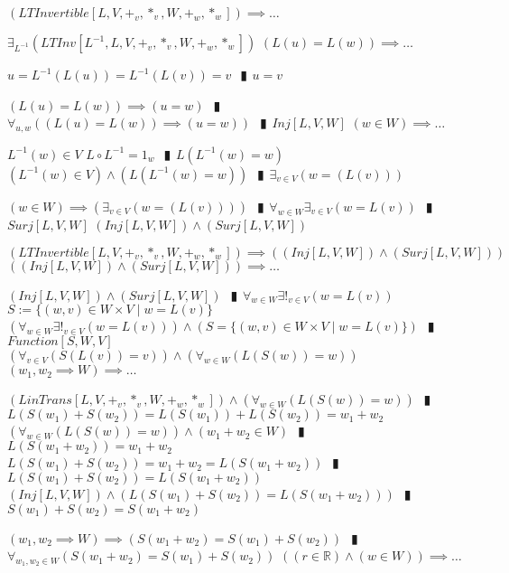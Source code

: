 \documentclass{book}
\newcommand{\abr}{:=}
\newcommand{\pipe}{$\phantom{(}\vrectangleblack\phantom{)}$}
\newcommand{\st}{\mathbin{|}}
\begin{document}
\begin{enumerate}
  \lit $(LTInvertible[L, V, +_v, *_v, W, +_w, *_w]) \implies \ldots$
  \begin{enumerate}
    \lit $\exists_{L^{-1}}(LTInv[L^{-1}, L, V, +_v, *_v, W, +_w, *_w])$
    \lit $(L(u) = L(w)) \implies \ldots$
    \begin{enumerate}
      \lit $u = L^{-1}(L(u)) = L^{-1}(L(v)) = v$ \pipe $u = v$
    \end{enumerate}
    \lit $(L(u) = L(w)) \implies (u = w)$ \pipe $\forall_{u, w}((L(u) = L(w)) \implies (u = w))$ \pipe $Inj[L, V, W]$
    \lit $(w \in W) \implies \ldots$
    \begin{enumerate}
      \lit $L^{-1}(w) \in V$
      \lit $L \circ L^{-1} = 1_w$ \pipe $L(L^{-1}(w) = w)$
      \lit $(L^{-1}(w) \in V) \land (L(L^{-1}(w) = w))$ \pipe $\exists_{v \in V}(w = (L(v)))$
    \end{enumerate}
    \lit $(w \in W) \implies (\exists_{v \in V}(w = (L(v))))$ \pipe $\forall_{w \in W} \exists_{v \in V}(w = L(v))$ \pipe $Surj[L, V, W]$
    \lit $(Inj[L, V, W]) \land (Surj[L, V, W])$
  \end{enumerate}
  \lit $(LTInvertible[L, V, +_v, *_v, W, +_w, *_w]) \implies ((Inj[L, V, W]) \land (Surj[L, V, W]))$
  \lit $((Inj[L, V, W]) \land (Surj[L, V, W])) \implies \ldots$
  \begin{enumerate}
    \lit $(Inj[L, V, W]) \land (Surj[L, V, W])$ \pipe $\forall_{w \in W} \exists!_{v \in V}(w = L(v))$
    \lit $S \abr \{(w, v) \in W \times V \st w = L(v)\}$
    \lit $(\forall_{w \in W} \exists!_{v \in V}(w = L(v))) \land (S = \{(w, v) \in W \times V \st w = L(v)\})$ \pipe $Function[S, W, V]$
    \lit $(\forall_{v \in V}(S(L(v)) = v)) \land (\forall_{w \in W}(L(S(w)) = w))$
    \lit $(w_1, w_2 \implies W) \implies \ldots$
    \begin{enumerate}
      \lit $(LinTrans[L, V, +_v, *_v, W, +_w, *_w]) \land (\forall_{w \in W}(L(S(w)) = w))$ \pipe $L(S(w_1) + S(w_2)) = L(S(w_1)) + L(S(w_2)) = w_1 + w_2$
      \lit $(\forall_{w \in W}(L(S(w)) = w)) \land (w_1 + w_2 \in W)$ \pipe $L(S(w_1 + w_2)) = w_1 + w_2$
      \lit $L(S(w_1) + S(w_2)) = w_1 + w_2 = L(S(w_1 + w_2))$ \pipe $L(S(w_1) + S(w_2)) = L(S(w_1 + w_2))$
      \lit $(Inj[L, V, W]) \land (L(S(w_1) + S(w_2)) = L(S(w_1 + w_2)))$ \pipe $S(w_1) + S(w_2) = S(w_1 + w_2)$
    \end{enumerate}
    \lit $(w_1, w_2 \implies W) \implies (S(w_1 + w_2) = S(w_1) + S(w_2))$ \pipe $\forall_{w_1, w_2 \in W}(S(w_1 + w_2) = S(w_1) + S(w_2))$
    \lit $((r \in \mathbb{R}) \land (w \in W)) \implies \ldots$

\end{enumerate}
\end{enumerate}
\end{document}
